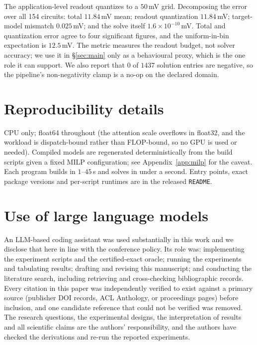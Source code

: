 \documentclass{article}
\theoremstyle{definition}
\begin{document}
The application-level readout quantizes to a $50$\,mV grid. Decomposing the error
over all 154 circuits: total $11.84$\,mV mean; readout quantization
$11.84$\,mV; target-model mismatch $0.025$\,mV; and the solve itself
$1.6\times10^{-10}$\,mV. Total and quantization error agree to four significant
figures, and the uniform-in-bin expectation is $12.5$\,mV. The metric measures
the readout budget, not solver accuracy; we use it in
\S\ref{sec:main} only as a behavioural proxy, which is the one role it can
support. We also report that $0$ of $1437$ solution entries are negative, so the
pipeline's non-negativity clamp is a no-op on the declared domain.

\section{Reproducibility details}\label{app:repro}

CPU only; float64 throughout (the attention scale overflows in float32, and the
workload is dispatch-bound rather than FLOP-bound, so no GPU is used or needed).
Compiled models are regenerated deterministically from the build scripts given a
fixed MILP configuration; see Appendix~\ref{app:milp} for the caveat. Each
program builds in $1$--$45$\,s and solves in under a second. Entry points, exact
package versions and per-script runtimes are in the released \texttt{README}.

\section{Use of large language models}\label{app:llm}

An LLM-based coding assistant was used substantially in this work and we disclose
that here in line with the conference policy. Its role was: implementing the
experiment scripts and the certified-exact oracle; running the experiments and
tabulating results; drafting and revising this manuscript; and conducting the
literature search, including retrieving and cross-checking bibliographic records.
Every citation in this paper was independently verified to exist against a
primary source (publisher DOI records, ACL Anthology, or proceedings pages)
before inclusion, and one candidate reference that could not be verified was
removed. The research questions, the experimental designs, the interpretation of
results and all scientific claims are the authors' responsibility, and the
authors have checked the derivations and re-run the reported experiments.
\end{document}
